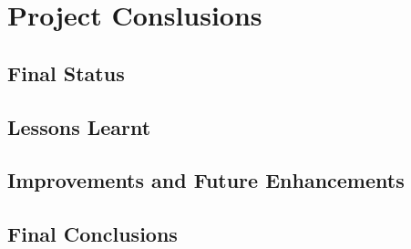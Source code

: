 \chapter{Project Conslusions}

\label{chap:conclusions}

\section{Final Status}

\label{sec:fstat}



\section{Lessons Learnt}



\section{Improvements and Future Enhancements}



\section{Final Conclusions}



